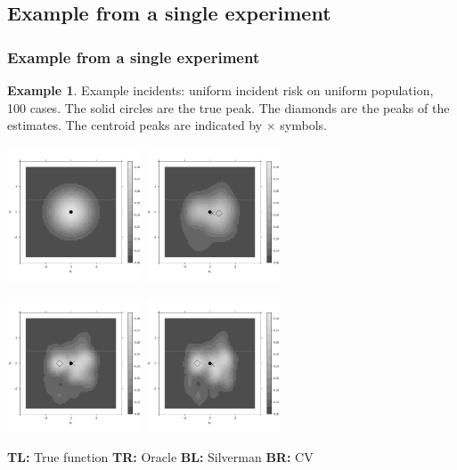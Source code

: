 \documentclass[notheorems]{beamer}
\theoremstyle{definition}
\theoremstyle{example}
\newtheorem{example}{Example}
\begin{document}
\subsection{Example from a single experiment}
\begin{frame}\frametitle{Example from a single experiment}
    \begin{example}
        {   \tiny
            Example incidents: uniform incident risk on uniform population, 100 cases.
            The solid circles are the true peak.
            The diamonds are the peaks of the estimates.
            The centroid peaks are indicated by $\times$ symbols.
        }
        \centerline{
             \includegraphics[width=0.3\textwidth]{results/unif_100_1.0_1h/output/true_intensity_heatmap}
             \includegraphics[width=0.3\textwidth]{results/unif_100_1.0_1h/output/oracle_intensity_heatmap}
        }
        \centerline{
             \includegraphics[width=0.3\textwidth]{results/unif_100_1.0_1h/output/silverman_intensity_heatmap}
             \includegraphics[width=0.3\textwidth]{results/unif_100_1.0_1h/output/CV_intensity_heatmap}
        }
        \centerline{
            \tiny
            \textbf{TL:} True function \textbf{TR:} Oracle \textbf{BL:} Silverman \textbf{BR:} CV
        }
    \end{example}
\end{frame}
\end{document}
